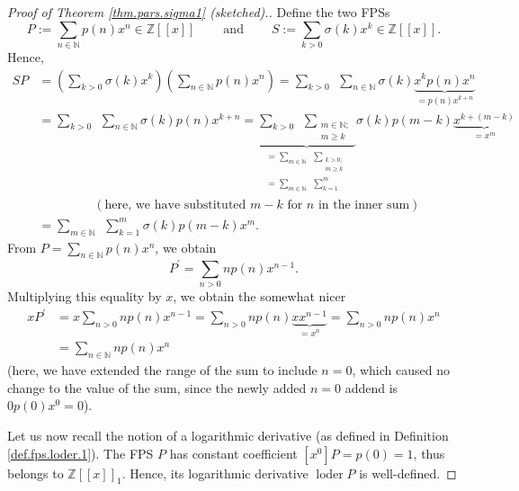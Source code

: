 \begin{proof}
[Proof of Theorem \ref{thm.pars.sigma1} (sketched).]Define the two FPSs%
\[
P:=\sum_{n\in\mathbb{N}}p\left(  n\right)  x^{n}\in\mathbb{Z}\left[  \left[
x\right]  \right]  \ \ \ \ \ \ \ \ \ \ \text{and}\ \ \ \ \ \ \ \ \ \ S:=\sum
_{k>0}\sigma\left(  k\right)  x^{k}\in\mathbb{Z}\left[  \left[  x\right]
\right]  .
\]
Hence,%
\begin{align}
SP  &  =\left(  \sum_{k>0}\sigma\left(  k\right)  x^{k}\right)  \left(
\sum_{n\in\mathbb{N}}p\left(  n\right)  x^{n}\right)  =\sum_{k>0}%
\ \ \sum_{n\in\mathbb{N}}\sigma\left(  k\right)  \underbrace{x^{k}p\left(
n\right)  x^{n}}_{=p\left(  n\right)  x^{k+n}}\nonumber\\
&  =\sum_{k>0}\ \ \sum_{n\in\mathbb{N}}\sigma\left(  k\right)  p\left(
n\right)  x^{k+n}=\underbrace{\sum_{k>0}\ \ \sum_{\substack{m\in
\mathbb{N};\\m\geq k}}}_{\substack{=\sum_{m\in\mathbb{N}}\ \ \sum
_{\substack{k>0;\\m\geq k}}\\=\sum_{m\in\mathbb{N}}\ \ \sum_{k=1}^{m}}%
}\sigma\left(  k\right)  p\left(  m-k\right)  \underbrace{x^{k+\left(
m-k\right)  }}_{=x^{m}}\nonumber\\
&  \ \ \ \ \ \ \ \ \ \ \ \ \ \ \ \ \ \ \ \ \left(  \text{here, we have
substituted }m-k\text{ for }n\text{ in the inner sum}\right) \nonumber\\
&  =\sum_{m\in\mathbb{N}}\ \ \sum_{k=1}^{m}\sigma\left(  k\right)  p\left(
m-k\right)  x^{m}. \label{pf.thm.pars.sigma1.SP=}%
\end{align}
From $P=\sum_{n\in\mathbb{N}}p\left(  n\right)  x^{n}$, we obtain%
\begin{equation}
P^{\prime}=\sum_{n>0}np\left(  n\right)  x^{n-1}.
\label{pf.thm.pars.sigma1.P'=}%
\end{equation}
Multiplying this equality by $x$, we obtain the somewhat nicer%
\begin{align}
xP^{\prime}  &  =x\sum_{n>0}np\left(  n\right)  x^{n-1}=\sum_{n>0}np\left(
n\right)  \underbrace{xx^{n-1}}_{=x^{n}}=\sum_{n>0}np\left(  n\right)
x^{n}\nonumber\\
&  =\sum_{n\in\mathbb{N}}np\left(  n\right)  x^{n}
\label{pf.thm.pars.sigma1.xP'=}%
\end{align}
(here, we have extended the range of the sum to include $n=0$, which caused no
change to the value of the sum, since the newly added $n=0$ addend is
$0p\left(  0\right)  x^{0}=0$).

Let us now recall the notion of a logarithmic derivative (as defined in
Definition \ref{def.fps.loder.1}). The FPS $P$ has constant coefficient
$\left[  x^{0}\right]  P=p\left(  0\right)  =1$, thus belongs to
$\mathbb{Z}\left[  \left[  x\right]  \right]  _{1}$. Hence, its logarithmic
derivative $\operatorname*{loder}P$ is well-defined.


\end{proof}
